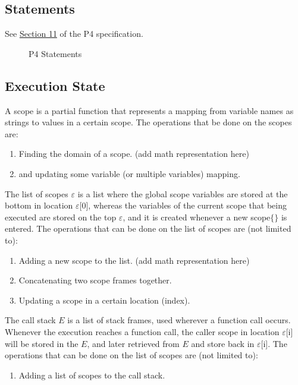 \documentclass[UTF8]{article}
\begin{document}
\newpage
\subsection{Statements}
\newcommand{\stmt}{\textit{stmt}}
\label{ssec:stmt}
See \href{https://p4.org/p4-spec/docs/P4-16-v1.2.1.html#sec-stmts}{Section 11} of the P4 specification.

\begin{figure}[h!]
\centering\ottgrammartabular{
\ottstmt\ottafterlastrule
}
\caption{P4 Statements}
\label{fig:stmt}
\end{figure}

\newpage
\newcommand{\state}{\Sigma}
\newcommand{\scope}{\ensuremath{\mathit{scope}}}
\newcommand{\stacks}{\sigma}
\newcommand{\currsf}{\ensuremath{\varepsilon}}
\newcommand{\gscope}{\ensuremath{\currsf [0] }}
\newcommand{\cstack}{E}
\newcommand{\status}{\textit{status}}
\subsection{Execution State}
A scope is a partial function that represents a mapping from variable names as strings to values in a certain scope. The operations that be done on the scopes are:
\begin{enumerate}
\item Finding the domain of a scope. (add math representation here)
\item and updating some variable (or multiple variables) mapping.
\end{enumerate}

The list of scopes $\currsf$ is a list where the global scope variables are stored at the bottom in location $\currsf$[0], whereas the variables of the current scope that being executed are stored on the top $\currsf$, and it is created whenever a new scope$\{ \}$ is entered. The operations that can be done on the list of scopes are (not limited to):
\begin{enumerate}
\item Adding a new scope to the list. (add math representation here)
\item Concatenating two scope frames together.
\item Updating a scope in a certain location (index).
\end{enumerate}

The call stack $\cstack$ is a list of stack frames, used wherever a function call occurs. Whenever the execution reaches a function call, the caller scope in location $\currsf$[i] will be stored in the $\cstack$, and later retrieved from $\cstack$ and store back in $\currsf$[i]. The operations that can be done on the list of scopes are (not limited to): 
\begin{enumerate}
\item Adding a list of scopes to the call stack.
\end{enumerate}
\end{document}
